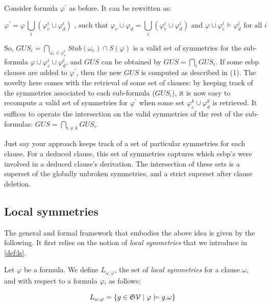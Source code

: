 
Consider formula $\varphi^\prime$ as before. It can be rewritten as:

$$\varphi^\prime=\varphi \, \underset{i}{\bigcup}(\varphi_e^i \cup \varphi_d^i) \text{ , such that } \varphi_e \cup \varphi_d = \underset{i}{\bigcup}(\varphi_e^i \cup \varphi_d^i) \text{ and } \varphi \cup \varphi_e^i \models \varphi_d^i  \text{ for all } i$$


So, $GUS_i = \underset{\omega_e \in \varphi_e^i}{\bigcap}Stab(\omega_e) \cap S(\varphi)$ is a valid set of symmetries for the sub-formula $\varphi \cup \varphi_e^i \cup \varphi_d^i$, and $GUS$ can be obtained by $GUS = \underset{i}{\bigcap} GUS_i$. If some esbp clauses are added to $\varphi^\prime$, then the new $GUS$ is computed as described in (1). The novelty here comes with the retrieval of some set of clauses: by keeping track of the symmetries associated to each sub-formula ($GUS_i$), it is now easy to recompute a valid set of symmetries for $\varphi^\prime$ when some set
$\varphi_e^k \cup \varphi_d^k$ is retrieved. It suffices to operate the intersection on the valid symmetries of the rest of the sub-formulas: $GUS = \underset{i \neq k}{\bigcap} GUS_i$.

Just say your approach keeps track of a set of particular symmetries for each clause. For a deduced clause, this set of symmetries captures which esbp's were involved in a deduced clause's derivation. The intersection of these sets is a superset of the globally unbroken symmetries, and a strict superset after clause deletion.


\subsection{Local symmetries}

The general and formal framework that embodies the above idea is given by the following. It first relies on the notion of \textit{local symmetries} that we introduce in \cref{def:ls}.

\begin{definition}
	\label{def:ls}
	Let $\varphi$ be a formula. We define $L_{\omega,\varphi}$, 
	the set of \textit{local symmetries} for a clause $\omega$, and with respect to 
	a formula $\varphi$, as follows:
	
	$$L_{\omega,\varphi}=\{g \in \mathfrak{S}{\mathcal{V}}\mid \varphi \models g.\omega\}$$
\end{definition}

